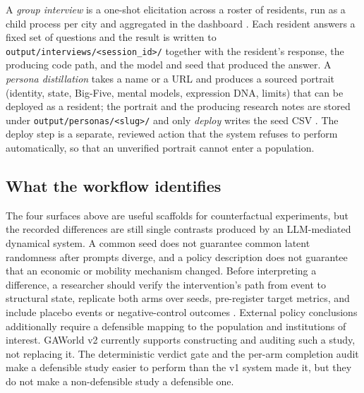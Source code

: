 A \emph{group interview} is a one-shot elicitation across a roster of
residents, run as a child process per city and aggregated in the dashboard
\citep{gaworldinterview}.  Each resident answers a fixed set of questions
and the result is written to \texttt{output/interviews/<session\_id>/}
together with the resident's response, the producing code path, and the
model and seed that produced the answer.  A \emph{persona distillation}
takes a name or a URL and produces a sourced portrait (identity, state,
Big-Five, mental models, expression DNA, limits) that can be deployed as a
resident; the portrait and the producing research notes are stored under
\texttt{output/personas/<slug>/} and only \emph{deploy} writes the seed CSV
\citep{gaworldpersona}.  The deploy step is a separate, reviewed action
that the system refuses to perform automatically, so that an unverified
portrait cannot enter a population.

\subsection{What the workflow identifies}

The four surfaces above are useful scaffolds for counterfactual
experiments, but the recorded differences are still single contrasts
produced by an LLM-mediated dynamical system.  A common seed does not
guarantee common latent randomness after prompts diverge, and a policy
description does not guarantee that an economic or mobility mechanism
changed.  Before interpreting a difference, a researcher should verify
the intervention's path from event to structural state, replicate both
arms over seeds, pre-register target metrics, and include placebo events
or negative-control outcomes \citep{lipsitch2010negative}.  External
policy conclusions additionally require a defensible mapping to the
population and institutions of interest.  GAWorld v2 currently supports
constructing and auditing such a study, not replacing it.  The
deterministic verdict gate and the per-arm completion audit make a
defensible study easier to perform than the v1 system made it, but they
do not make a non-defensible study a defensible one.
